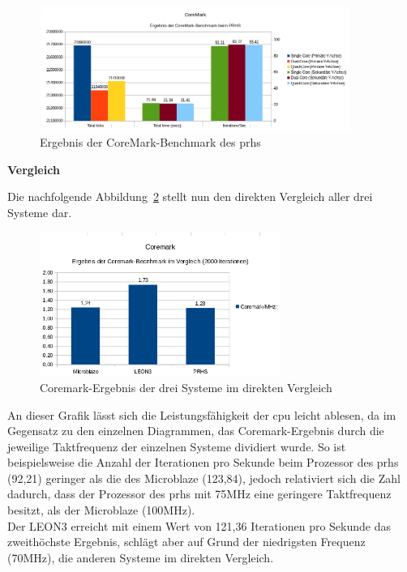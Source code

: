 \begin{figure}[H]
\centering
\includegraphics[width=0.9\textwidth]{Hauptteil/coremarkprhs.png}
\caption{Ergebnis der CoreMark-Benchmark des \ac{prhs}}
\label{fig:coremarkprhs}
\end{figure}

\textbf{Vergleich}

Die nachfolgende Abbildung~\ref{fig:coremarkresult} stellt nun den direkten Vergleich aller drei Systeme dar.\\

\begin{figure}[H]
\centering
\includegraphics[width=0.7\textwidth]{Hauptteil/coremarkresult.png}
\caption{Coremark-Ergebnis der drei Systeme im direkten Vergleich}
\label{fig:coremarkresult}
\end{figure}

An dieser Grafik lässt sich die Leistungsfähigkeit der \ac{cpu} leicht ablesen, da im Gegensatz zu den einzelnen Diagrammen, das Coremark-Ergebnis durch die jeweilige Taktfrequenz der
einzelnen Systeme dividiert wurde. So ist beispielsweise die Anzahl der Iterationen pro Sekunde beim Prozessor des \ac{prhs} (92,21) geringer als die des Microblaze (123,84), jedoch
relativiert sich die Zahl dadurch, dass der Prozessor des \ac{prhs} mit 75MHz eine geringere Taktfrequenz besitzt, als der Microblaze (100MHz). \\
Der LEON3 erreicht mit einem Wert von 121,36 Iterationen pro Sekunde das zweithöchste Ergebnis, schlägt aber auf Grund der niedrigsten Frequenz (70MHz), die anderen Systeme im direkten Vergleich.\\

